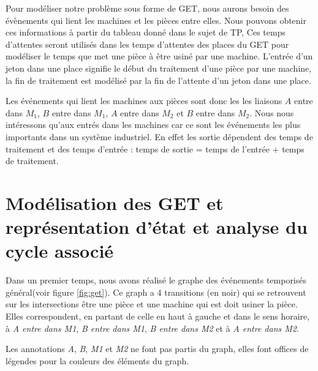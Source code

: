 Pour modéliser notre problème sous forme de GET, nous aurons besoin des évènements qui lient les machines et les pièces entre elles. Nous pouvons obtenir ces informations à partir du tableau donné dans le sujet de TP,  Ces temps d'attentes seront utilisés dans les temps d'attentes des places du GET pour modéliser le temps que met une pièce à être usiné par une machine. L'entrée d'un jeton dans une place signifie le début du traitement d'une pièce par une machine, la fin de traitement est modélisé par la fin de l'attente d'un jeton dans une place. 

Les événements qui lient les machines aux pièces sont donc les les liaisons $A$ entre dans $M_1$, $B$ entre dans $M_1$, $A$ entre dans $M_2$ et $B$ entre dans $M_2$. Nous nous intéressons qu'aux entrés dans les machines car ce sont les événements les plus importants dans un système industriel. En effet les sortie dépendent des temps de traitement et des temps d'entrée : temps de sortie = temps de l'entrée + temps de traitement.

\section{Modélisation des GET et représentation d'état et analyse du cycle associé}

Dans un premier temps, nous avons réalisé le graphe des événements temporisés général(voir figure \ref{fig:get}). Ce graph a 4 transitions (en noir) qui se retrouvent sur les intersections être une pièce et une machine qui est doit usiner la pièce. Elles correspondent, en partant de celle en haut à gauche et dans le sens horaire, à \emph{A entre dans M1}, \emph{B entre dans M1}, \emph{B entre dans M2} et à \emph{A entre dans M2}. 

Les annotations \emph{A}, \emph{B}, \emph{M1} et \emph{M2} ne font pas partis du graph, elles font offices de légendes pour la couleurs des éléments du graph.

